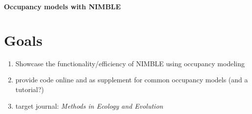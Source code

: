 \documentclass[12pt]{article}
\begin{document}
\begin{centering}
  \large {\bf Occupancy models with NIMBLE} \\
\end{centering}
\vspace{0.15in}


\section{Goals}
\begin{enumerate}
\item Showcase the functionality/efficiency of NIMBLE using occupancy
  modeling
\item provide code online and as supplement for common occupancy
  models (and a tutorial?)
\item target journal: \textit{Methods in Ecology and Evolution}
\end{enumerate}
\end{document}
